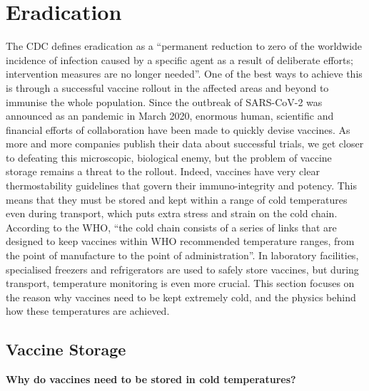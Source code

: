 \documentclass[11pt]{report}
\begin{document}
			
		\section{Eradication}
		
The CDC defines eradication as a “permanent reduction to zero of the worldwide incidence of infection caused by a specific agent as a result of deliberate efforts; intervention measures are no longer needed”. One of the best ways to achieve this is through a successful vaccine rollout in the affected areas and beyond to immunise the whole population. Since the outbreak of SARS-CoV-2 was announced as an pandemic in March 2020, enormous human, scientific and financial efforts of collaboration have been made to quickly devise vaccines. As more and more companies publish their data about successful trials, we get closer to defeating this microscopic, biological enemy, but the problem of vaccine storage remains a threat to the rollout. Indeed, vaccines have very clear thermostability guidelines that govern their immuno-integrity and potency. This means that they must be stored and kept within a range of cold temperatures even during transport, which puts extra stress and strain on the cold chain. According to the WHO, “the cold chain consists of a series of links that are designed to keep vaccines within WHO recommended temperature ranges, from the point of manufacture to the point of administration”. In laboratory facilities, specialised freezers and refrigerators are used to safely store vaccines, but during transport, temperature monitoring is even more crucial. This section focuses on the reason why vaccines need to be kept extremely cold, and the physics behind how these temperatures are achieved.
		
			\subsection{Vaccine Storage}

\textbf{Why do vaccines need to be stored in cold temperatures?}
\end{document}
